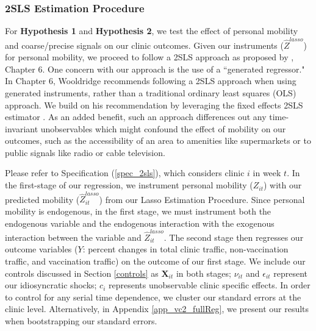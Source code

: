  \subsubsection{2SLS Estimation Procedure} \label{2sls}
 For \textbf{Hypothesis 1} and \textbf{Hypothesis 2}, we test the effect of personal mobility and coarse/precise signals on our clinic outcomes. Given our instruments ($\hat{Z}^{lasso}$) for personal mobility, we proceed to follow a 2SLS approach as proposed by \cite{Wooldridge2010}, Chapter 6. One concern with our approach is the use of a “generated regressor." In Chapter 6, Wooldridge recommends following a 2SLS approach when using generated instruments, rather than a traditional ordinary least squares (OLS) approach. We build on his recommendation by leveraging the fixed effects 2SLS estimator \citep[Chapter 11]{Wooldridge2010}. As an added benefit, such an approach differences out any time-invariant unobservables which might confound the effect of mobility on our outcomes, such as the accessibility of an area to amenities like supermarkets or to public signals like radio or cable television.
 
 Please refer to Specification (\ref{spec_2sls}), which considers clinic $i$ in week $t$. In the first-stage of our regression, we instrument personal mobility ($Z_{it}$) with our predicted mobility ($\hat{Z}_{it}^{lasso}$) from our Lasso Estimation Procedure. Since personal mobility is endogenous, in the first stage, we must instrument both the endogenous variable and the endogenous interaction with the exogenous interaction between the variable and $\hat{Z}_{it}^{lasso}$. The second stage then regresses our outcome variables ($Y$: percent changes in total clinic traffic, non-vaccination traffic, and vaccination traffic) on the outcome of our first stage. We include our controls discussed in Section \ref{controls} as $\boldsymbol{X}_{it}$ in both stages; $\nu_{it}$ and $\epsilon_{it}$ represent our idiosyncratic shocks; $c_i$ represents unobservable clinic specific effects. In order to control for any serial time dependence, we cluster our standard errors at the clinic level. Alternatively, in Appendix \ref{app_vc2_fullReg}, we present our results when bootstrapping our standard errors.

